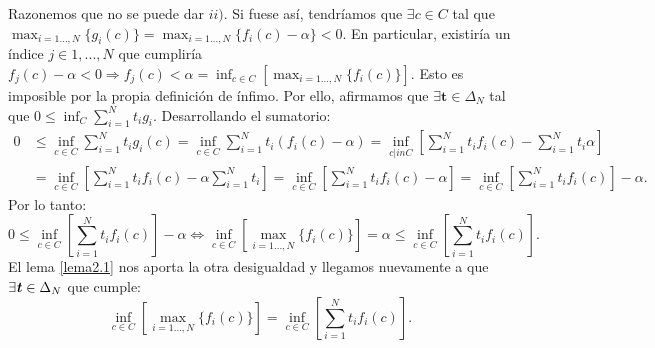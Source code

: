 	Razonemos que no se puede dar $ ii) $. Si fuese así, tendríamos que $ \exists c \in C $ tal que $ \max_{i=1\dots,N } \{g_i(c)\} =  \max_{i=1\dots,N } \{f_i(c) - \alpha \} < 0 $. En particular, existiría un índice $ j \in {1,...,N} $ que cumpliría $ f_j(c) - \alpha < 0 \Longrightarrow f_j(c) < \alpha = \inf_{ c\in C}\left[\max_{i=1\dots,N } \{f_i(c)\} \right] $. Esto es imposible por la propia definición de ínfimo. Por ello, afirmamos que $ \exists \mathbf{t} \in \Delta_N $ tal que $ 0 \leq \inf_{C}  \sum_{i=1}^{N}{t_i g_i}$. Desarrollando el sumatorio:
	\begin{equation*}
	\begin{split}
	0 &\leq \inf_{c \in C}  \sum_{i=1}^{N}{t_i g_i (c)} = \inf_{c \in C}  \sum_{i=1}^{N}{t_i(f_i(c) - \alpha)} = \inf_{c |in C} \left[ \sum_{i=1}^{N}{t_i f_i(c)} - \sum_{i=1}^{N}{t_i\alpha} \right]\\
	&= \inf_{c \in C} \left[ \sum_{i=1}^{N}{t_i f_i(c)} -\alpha \sum_{i=1}^{N}{t_i} \right] = \inf_{c \in C} \left[ \sum_{i=1}^{N}{t_i f_i(c)} - \alpha \right] = \inf_{c \in C} \left[ \sum_{i=1}^{N}{t_i f_i(c)}\right] - \alpha.
	\end{split}
	\end{equation*}
	Por lo tanto:
	\[
	0 \leq \inf_{c \in C} \left[ \sum_{i=1}^{N}{t_i f_i(c)}\right] - \alpha \Longleftrightarrow \inf_{c \in C}\left[ \max_{i=1\dots,N } \{f_i(c)\}\right] = \alpha  \leq \inf_{c \in C} \left[ \sum_{i=1}^{N}{t_i f_i(c)}\right].
	\]
	El lema \ref{lema2.1} nos aporta la otra desigualdad y llegamos nuevamente a que $ \exists \textbf{\emph{t}} \in \Delta_N $ que cumple:
	\[
	\inf_{c \in C}\left[ \max_{i=1\dots,N } \{f_i(c)\}\right] = \inf_{c \in C} \left[ \sum_{i=1}^{N}{t_i f_i(c)}\right]. \]
	